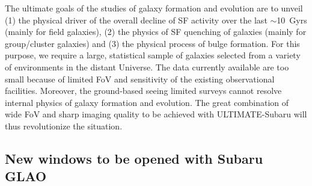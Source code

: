 The ultimate goals of the studies of galaxy formation and evolution are
to unveil (1) the physical driver of the overall decline of SF
activity over the last $\sim$10~Gyrs (mainly for field galaxies), 
(2) the physics of SF quenching of galaxies (mainly for group/cluster
galaxies) and (3) the physical process of bulge formation. 
For this purpose, we require a large, statistical sample of
galaxies selected from a variety of environments in the distant Universe.
The data currently available are too small
because of limited FoV and sensitivity of the existing observational facilities.
Moreover, the ground-based seeing limited surveys
cannot resolve internal physics of galaxy formation and evolution.
The great combination of wide FoV and
sharp imaging quality to be achieved with ULTIMATE-Subaru will
thus revolutionize the situation.

\subsection{New windows to be opened with Subaru GLAO}

